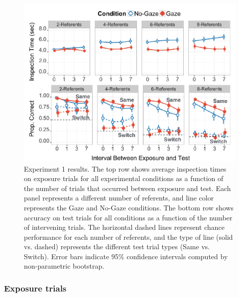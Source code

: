 \documentclass[authoryear, review]{elsarticle}
\newenvironment{CodeChunk}{}{}
\begin{document}
\begin{CodeChunk}
\begin{figure}[tb]

{\centering \includegraphics[width=0.9\linewidth]{figs/expt1-plot-1} 

}

\caption[Experiment 1 results]{Experiment 1 results. The top row shows average inspection times on exposure trials for all experimental conditions as a function of the number of trials that occurred between exposure and test. Each panel represents a different number of referents, and line color represents the Gaze and No-Gaze conditions. The bottom row shows accuracy on test trials for all conditions as a function of the number of intervening trials. The horizontal dashed lines represent chance performance for each number of referents, and the type of line (solid vs. dashed) represents the different test trial types (Same vs. Switch). Error bars indicate 95\% confidence intervals computed by non-parametric bootstrap.}\label{fig:expt1-plot}
\end{figure}
\end{CodeChunk}

\subsubsection{Exposure trials}\label{exposure-trials}
\end{document}
